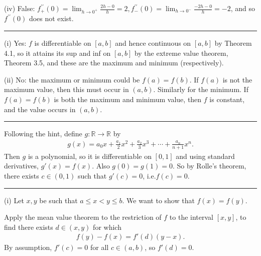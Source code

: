 \documentclass[letterpaper,10pt,english]{jupyterBook}
\begin{document}
\sphinxAtStartPar
(iv) False:  \(f^{\prime \prime}_{+}(0) = \lim_{h \rightarrow 0^+}\frac{2h - 0}{h} = 2, f^{\prime \prime}_{-}(0) = \lim_{h \rightarrow 0^-}\frac{-2h - 0}{h} = -2\), and so \(f^{\prime \prime}(0)\) does not exist.


\bigskip\hrule\bigskip


\sphinxAtStartPar
{\hyperref[\detokenize{Problems:id47}]{}}
(i) Yes: \(f\) is differentiable on \([a, b]\) and hence continuous on \([a, b]\) by Theorem  4.1, so it attains its sup and inf on \([a, b]\) by the extreme value theorem, Theorem 3.5, and these are the maximum and minimum (respectively).

\sphinxAtStartPar
(ii) No: the maximum or minimum could be \(f(a)=f(b)\).
If \(f(a)\) is not the maximum value, then this must occur in \((a, b)\). Similarly for the minimum. If \(f(a) = f(b)\) is both the maximum and minimum value, then \(f\) is constant, and the value occurs in \((a, b)\).


\bigskip\hrule\bigskip


\sphinxAtStartPar
{\hyperref[\detokenize{Problems:id48}]{}} Following the hint, define \(g:\mathbb{R}\rightarrow \mathbb{R}\) by
\begin{equation*}
\begin{split}
g(x) = a_{0}x + \frac{a_{1}}{2}x^{2} + \frac{a_{2}}{3}x^{3}  + \cdots + \frac{a_{n}}{n+1}x^{n}.
\end{split}
\end{equation*}
\sphinxAtStartPar
Then \(g\) is a polynomial, so it is differentiable on \([0, 1]\) and using standard derivatives, \(g'(x)=f(x)\). Also \(g(0) = g(1) = 0\). So by Rolle’s theorem, there exists \(c \in (0, 1)\) such that \(g'(c) = 0\), i.e.\(f(c) = 0\).


\bigskip\hrule\bigskip


\sphinxAtStartPar
{\hyperref[\detokenize{Problems:id49}]{}}
(i) Let \(x, y\) be such that \(a \leq x < y \leq b\). We want to show that \(f(x)=f(y)\).

\sphinxAtStartPar
Apply the mean value theorem to the restriction of \(f\) to the interval \([x, y]\), to find there exists \(d \in (x, y)\) for which
\begin{equation*}
\begin{split}
f(y) - f(x) = f'(d)(y-x).
\end{split}
\end{equation*}
\sphinxAtStartPar
By assumption, \(f'(c)=0\) for all \(c\in(a,b)\), so \(f'(d)=0\).
\end{document}
